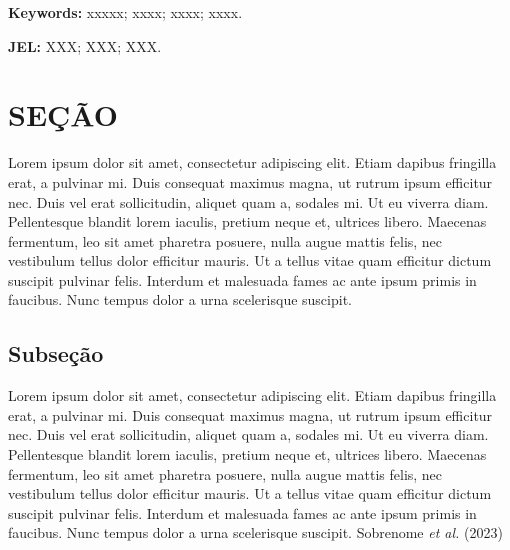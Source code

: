 \documentclass[
  12pt,
  a4paper,
]{td}
\begin{document}
\textbf{Keywords:} xxxxx; xxxx; xxxx; xxxx.

\textbf{JEL:} XXX; XXX; XXX.

\newpage{}

\hypertarget{seuxe7uxe3o}{%
\section{SEÇÃO}\label{seuxe7uxe3o}}

Lorem ipsum dolor sit amet, consectetur adipiscing elit. Etiam dapibus
fringilla erat, a pulvinar mi. Duis consequat maximus magna, ut rutrum
ipsum efficitur nec. Duis vel erat sollicitudin, aliquet quam a, sodales
mi. Ut eu viverra diam. Pellentesque blandit lorem iaculis, pretium
neque et, ultrices libero. Maecenas fermentum, leo sit amet pharetra
posuere, nulla augue mattis felis, nec vestibulum tellus dolor efficitur
mauris. Ut a tellus vitae quam efficitur dictum suscipit pulvinar felis.
Interdum et malesuada fames ac ante ipsum primis in faucibus. Nunc
tempus dolor a urna scelerisque suscipit.

\hypertarget{subseuxe7uxe3o}{%
\subsection{Subseção}\label{subseuxe7uxe3o}}

Lorem ipsum dolor sit amet, consectetur adipiscing elit. Etiam dapibus
fringilla erat, a pulvinar mi. Duis consequat maximus magna, ut rutrum
ipsum efficitur nec. Duis vel erat sollicitudin, aliquet quam a, sodales
mi. Ut eu viverra diam. Pellentesque blandit lorem iaculis, pretium
neque et, ultrices libero. Maecenas fermentum, leo sit amet pharetra
posuere, nulla augue mattis felis, nec vestibulum tellus dolor efficitur
mauris. Ut a tellus vitae quam efficitur dictum suscipit pulvinar felis.
Interdum et malesuada fames ac ante ipsum primis in faucibus. Nunc
tempus dolor a urna scelerisque suscipit. Sobrenome \emph{et al.} (2023)
\end{document}
